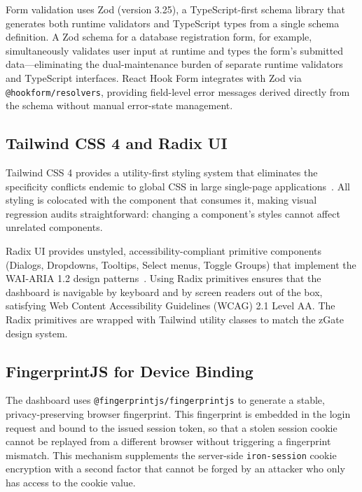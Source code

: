 Form validation uses Zod (version 3.25), a TypeScript-first schema library that generates both runtime validators and TypeScript types from a single schema definition. A Zod schema for a database registration form, for example, simultaneously validates user input at runtime and types the form's submitted data---eliminating the dual-maintenance burden of separate runtime validators and TypeScript interfaces. React Hook Form integrates with Zod via \texttt{@hookform/resolvers}, providing field-level error messages derived directly from the schema without manual error-state management.

\subsection{Tailwind CSS 4 and Radix UI}

Tailwind CSS 4 provides a utility-first styling system that eliminates the specificity conflicts endemic to global CSS in large single-page applications~\cite{tailwind-docs}. All styling is colocated with the component that consumes it, making visual regression audits straightforward: changing a component's styles cannot affect unrelated components.

Radix UI provides unstyled, accessibility-compliant primitive components (Dialogs, Dropdowns, Tooltips, Select menus, Toggle Groups) that implement the WAI-ARIA 1.2 design patterns~\cite{wai-aria}. Using Radix primitives ensures that the dashboard is navigable by keyboard and by screen readers out of the box, satisfying Web Content Accessibility Guidelines (WCAG) 2.1 Level AA. The Radix primitives are wrapped with Tailwind utility classes to match the zGate design system.

\subsection{FingerprintJS for Device Binding}

The dashboard uses \texttt{@fingerprintjs/fingerprintjs} to generate a stable, privacy-preserving browser fingerprint. This fingerprint is embedded in the login request and bound to the issued session token, so that a stolen session cookie cannot be replayed from a different browser without triggering a fingerprint mismatch. This mechanism supplements the server-side \texttt{iron-session} cookie encryption with a second factor that cannot be forged by an attacker who only has access to the cookie value.

